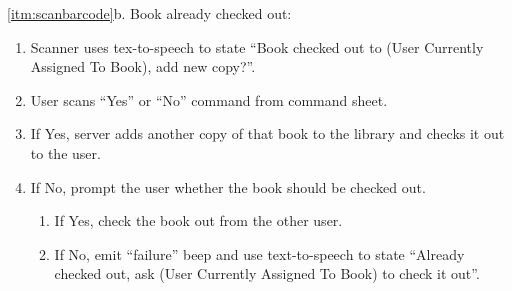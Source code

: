 \documentclass[a4paper, 10pt, oneside, draft]{article}
\begin{document}
\begin{usecase}
{    \item[\ref{itm:scanbarcode}b.] Book already checked out:
        \begin{enumerate}[1.]
        \item Scanner uses tex-to-speech to state ``Book checked out to (User
            Currently Assigned To Book), add new copy?''.
        \item User scans ``Yes'' or ``No'' command from command sheet.
        \item If Yes, server adds another copy of that book to the library and
            checks it out to the user.
        \item If No, prompt the user whether the book should be checked out.
            \begin{enumerate}[1.]
            \item If Yes, check the book out from the other user.
            \item If No, emit ``failure'' beep and use text-to-speech to state
                ``Already checked out, ask (User Currently Assigned To Book)
                to check it out''.
            \end{enumerate}
        \end{enumerate}
}





\end{usecase}



\newpage
\end{document}
